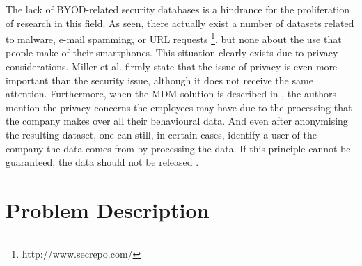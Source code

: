 \documentclass[a4paper,10pt,twocolumn,preprint,3p]{elsarticle}
\begin{document}
The lack of BYOD-related security databases is a hindrance for the
proliferation of research in this field. As seen, there actually exist
a number of datasets related to malware, e-mail spamming, or URL
requests \footnote{http://www.secrepo.com/}, but none about the use
that people make of their smartphones. This situation clearly exists
due to privacy considerations. Miller et al. \cite{Miller201253}
firmly state that the issue of privacy is even more important than the
security issue, although it does not receive the same
attention. Furthermore, when the MDM solution is described in
\cite{ali2015analysis}, the authors mention the privacy concerns the
employees may have due to the processing that the company makes over
all their behavioural data. And even after anonymising the resulting
dataset, one can still, in certain cases, identify a user of the
company the data comes from by processing the data. If this principle
cannot be guaranteed, the data should not be released
\cite{boillat2014handbook}. 


\section{Problem Description}
\label{sec:problem}
\end{document}
